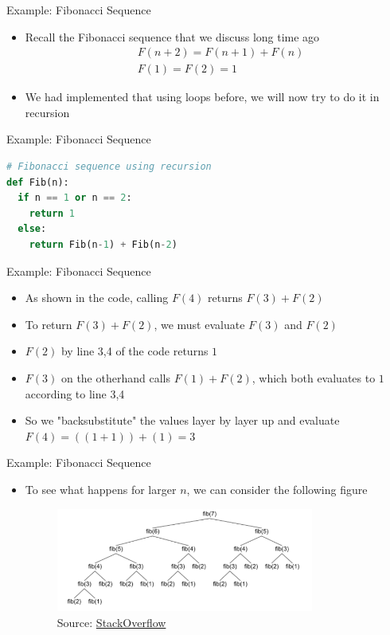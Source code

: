 \documentclass[10pt,xcolor={table,dvipsnames},t]{beamer}
\begin{document}
\begin{frame}{Example: Fibonacci Sequence}
  \begin{itemize}
    \item Recall the Fibonacci sequence that we discuss long time ago
    \begin{align*}
        &F(n+2) = F(n+1) + F(n)\\
        &F(1) = F(2) = 1
    \end{align*}
    \item We had implemented that using loops before, we will now try to do it in recursion 
  \end{itemize}
\end{frame}

\begin{frame}[fragile]{Example: Fibonacci Sequence}
  \begin{lstlisting}[language=python]
# Fibonacci sequence using recursion
def Fib(n):
  if n == 1 or n == 2:
    return 1
  else:
    return Fib(n-1) + Fib(n-2)
  \end{lstlisting}
\end{frame}


\begin{frame}{Example: Fibonacci Sequence}
  \begin{itemize}
    \item As shown in the code, calling $F(4)$ returns $F(3)+F(2)$ 
    \item To return $F(3)+F(2)$, we must evaluate $F(3)$ and $F(2)$
    \item $F(2)$ by line 3,4 of the code returns $1$
    \item $F(3)$ on the otherhand calls $F(1)+F(2)$, which both evaluates to $1$ according to line 3,4
    \item So we "backsubstitute" the values layer by layer up and evaluate $F(4) = ((1+1)) + (1) = 3$
  \end{itemize}
\end{frame}

\begin{frame}{Example: Fibonacci Sequence}
  \begin{itemize}
    \item To see what happens for larger $n$, we can consider the following figure
    \begin{figure}
      \centering
      \includegraphics[width=0.8\textwidth]{img/fib-tree.png}      
      \caption*{Source: \href{https://stackoverflow.com/questions/35959100/explanation-on-fibonacci-recursion}{StackOverflow}}
    \end{figure}
  \end{itemize}
\end{frame}
\end{document}
